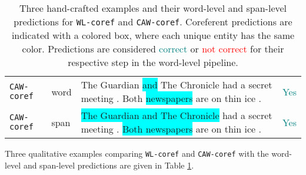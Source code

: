 \documentclass[11pt]{article}
\newcommand\wlcoref{{\texttt{WL-coref}}}
\newcommand\cawcoref{{\texttt{CAW-coref}}}
\begin{document}
\begin{table}[t]
\begin{tabularx}{\textwidth}{l|l|X|l}
         \cawcoref{} & word &  The Guardian \colorbox{cyan}{and} The Chronicle had a secret meeting . Both \colorbox{cyan}{newspapers} are on thin ice . & \textcolor{teal}{Yes}\\
         \cawcoref{} & span & \colorbox{cyan}{The Guardian and The Chronicle} had a secret meeting . \colorbox{cyan}{Both newspapers} are on thin ice . & \textcolor{teal}{Yes}\\ \bottomrule
    \end{tabularx}
\caption{Three hand-crafted examples and their word-level and span-level predictions for \wlcoref{} and \cawcoref{}. Coreferent predictions are indicated with a colored box, where each unique entity has the same color. Predictions are considered \textcolor{teal}{correct} or \textcolor{red}{not correct} for their respective step in the word-level pipeline.}
\label{table:app-examples}
\end{table} 
Three qualitative examples comparing \wlcoref{} and \cawcoref{} with the word-level and span-level predictions are given in Table \ref{table:app-examples}.
\end{document}
